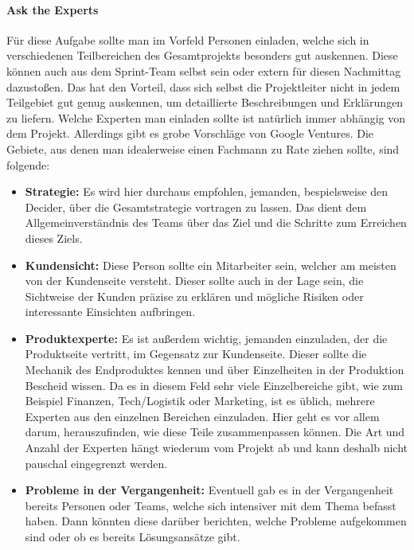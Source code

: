 \paragraph{Ask the Experts}
Für diese Aufgabe sollte man im Vorfeld Personen einladen, welche sich in verschiedenen Teilbereichen des Gesamtprojekts besonders gut auskennen. Diese können auch aus dem Sprint-Team selbst sein oder extern für diesen Nachmittag dazustoßen. Das hat den Vorteil, dass sich selbst die Projektleiter nicht in jedem Teilgebiet gut genug auskennen, um detaillierte Beschreibungen und Erklärungen zu liefern. Welche Experten man einladen sollte ist natürlich immer abhängig von dem Projekt. Allerdings gibt es grobe Vorschläge von Google Ventures.
Die Gebiete, aus denen man idealerweise einen Fachmann zu Rate ziehen sollte, sind folgende: 
\begin{itemize}
	\item \textbf{Strategie:}
	Es wird hier durchaus empfohlen, jemanden, bespielsweise den Decider, über die Gesamtstrategie vortragen zu lassen. Das dient dem Allgemeinverständnis des Teams über das Ziel und die Schritte zum Erreichen dieses Ziels. 
	\item \textbf{Kundensicht:}
	Diese Person sollte ein Mitarbeiter sein, welcher am meisten von der Kundenseite versteht. Dieser sollte auch in der Lage sein, die Sichtweise der Kunden präzise zu erklären und mögliche Risiken oder interessante Einsichten aufbringen.
	\item \textbf{Produktexperte:}
	Es ist außerdem wichtig, jemanden einzuladen, der die Produktseite vertritt, im Gegensatz zur Kundenseite. Dieser sollte die Mechanik des Endproduktes kennen und über Einzelheiten in der Produktion Bescheid wissen. Da es in diesem Feld sehr viele Einzelbereiche gibt, wie zum Beispiel Finanzen, Tech/Logistik oder Marketing, ist es üblich, mehrere Experten aus den einzelnen Bereichen einzuladen. Hier geht es vor allem darum, herauszufinden, wie diese Teile zusammenpassen können. Die Art und Anzahl der Experten hängt wiederum vom Projekt ab und kann deshalb nicht pauschal eingegrenzt werden.
	\item \textbf{Probleme in der Vergangenheit:}
	Eventuell gab es in der Vergangenheit bereits Personen oder Teams, welche sich intensiver mit dem Thema befasst haben. Dann könnten diese darüber berichten, welche Probleme aufgekommen sind oder ob es bereits Lösungsansätze gibt.
\end{itemize}

